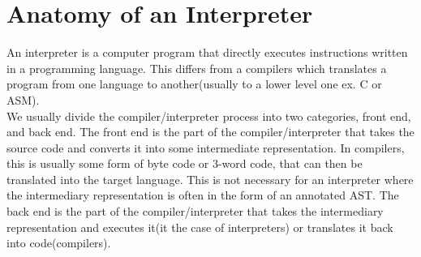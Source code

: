 \chapter{Anatomy of an Interpreter}
\label{sec:anatomy}
        
An \gls{interpreter} is a computer program that directly executes instructions written in a programming language.
This differs from a \glspl{compiler} which translates a program from one language to another(usually to a lower level one ex. C or ASM).\\
We usually divide the compiler/interpreter process into two categories, front end, and back end.
The front end is the part of the compiler/interpreter that takes the source code and converts it into some intermediate representation.
In compilers, this is usually some form of byte code or 3-word code, that can then be translated into the target language. 
This is not necessary for an interpreter where the intermediary representation is often in the form of an annotated AST.
The back end is the part of the compiler/interpreter that takes the intermediary representation and executes it(it the case of interpreters) or translates it back into code(compilers).\\

